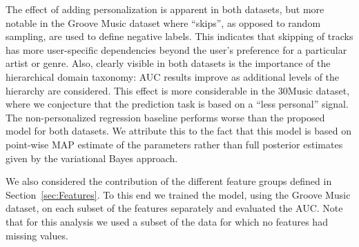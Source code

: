 The effect of adding personalization is apparent in both datasets, but more notable in the Groove Music dataset where ``skips'', as opposed to random sampling, are used to define negative labels. This indicates that skipping of tracks has more user-specific dependencies beyond the user's preference for a particular artist or genre.
Also, clearly visible in both datasets is the importance of the hierarchical domain taxonomy: AUC results improve as additional levels of the hierarchy are considered. This effect is more considerable in the 30Music dataset, where we conjecture that the prediction task is based on a ``less personal'' signal. The non-personalized regression baseline performs worse than the proposed model for both datasets. We attribute this to the fact that this model is based on point-wise MAP estimate of the parameters rather than full posterior estimates given by the variational Bayes approach.


%

%


%




We also considered the contribution of the different feature groups defined in Section~\ref{sec:Features}. To this end we trained the model, using the Groove Music dataset, on each subset of the features separately and evaluated the AUC. Note that for this analysis we used a subset of the data for which no features had missing values. 

